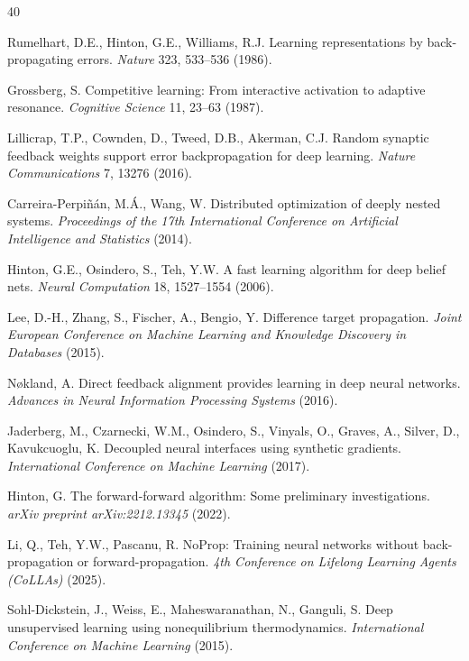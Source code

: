 \documentclass[preprint,12pt]{elsarticle}
\begin{document}
\begin{thebibliography}{40}

Rumelhart, D.E., Hinton, G.E., Williams, R.J. 
Learning representations by back-propagating errors. 
\textit{Nature} 323, 533--536 (1986).

Grossberg, S. 
Competitive learning: From interactive activation to adaptive resonance. 
\textit{Cognitive Science} 11, 23--63 (1987).

Lillicrap, T.P., Cownden, D., Tweed, D.B., Akerman, C.J. 
Random synaptic feedback weights support error backpropagation for deep learning. 
\textit{Nature Communications} 7, 13276 (2016).

Carreira-Perpi{\~n}{\'a}n, M.{\'A}., Wang, W. 
Distributed optimization of deeply nested systems. 
\textit{Proceedings of the 17th International Conference on Artificial Intelligence and Statistics} (2014).

Hinton, G.E., Osindero, S., Teh, Y.W. 
A fast learning algorithm for deep belief nets. 
\textit{Neural Computation} 18, 1527--1554 (2006).

Lee, D.-H., Zhang, S., Fischer, A., Bengio, Y. 
Difference target propagation. 
\textit{Joint European Conference on Machine Learning and Knowledge Discovery in Databases} (2015).

N{\o}kland, A. 
Direct feedback alignment provides learning in deep neural networks. 
\textit{Advances in Neural Information Processing Systems} (2016).

Jaderberg, M., Czarnecki, W.M., Osindero, S., Vinyals, O., Graves, A., Silver, D., Kavukcuoglu, K. 
Decoupled neural interfaces using synthetic gradients. 
\textit{International Conference on Machine Learning} (2017).

Hinton, G. 
The forward-forward algorithm: Some preliminary investigations. 
\textit{arXiv preprint arXiv:2212.13345} (2022).

Li, Q., Teh, Y.W., Pascanu, R. 
NoProp: Training neural networks without back-propagation or forward-propagation. 
\textit{4th Conference on Lifelong Learning Agents (CoLLAs)} (2025).

Sohl-Dickstein, J., Weiss, E., Maheswaranathan, N., Ganguli, S. 
Deep unsupervised learning using nonequilibrium thermodynamics. 
\textit{International Conference on Machine Learning} (2015).


\end{thebibliography}
\end{document}
